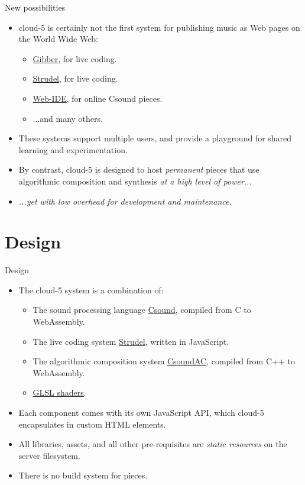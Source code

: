 \documentclass{beamer}
\begin{document}
\begin{frame}{New possibilities}
\begin{itemize}
\item cloud-5 is certainly not the first system for publishing music as Web pages on the World Wide Web:
\begin{itemize}
\item \href{https://gibber.cc/playground/}{Gibber}, for live coding.
\item \href{https://strudel.cc/}{Strudel}, for live coding.
\item \href{https://ide.csound.com/}{Web-IDE}, for online Csound pieces.
\item ...and many others.
\end{itemize}
\item These systems support multiple users, and provide a playground for shared learning and experimentation.
\item By contrast, cloud-5 is designed to host \emph{permanent} pieces that use algorithmic composition and synthesis \emph{at a high level of power...}
\item\emph{ ...yet with low overhead for development and maintenance.}
\end{itemize}
\end{frame}

\section{Design}
\begin{frame}{Design}
\begin{itemize}
\item The cloud-5 system is a combination of:
\begin{itemize}
\item The sound processing language \href{https://csound.com/}{Csound}, compiled from C to WebAssembly.
\item The live coding system \href{https://strudel.cc}{Strudel}, written in JavaScript.
\item The algorithmic composition system \href{https://github.com/gogins/csound-ac/blob/master/README.md}{CsoundAC}, compiled from C++ to WebAssembly.
\item \href{https://www.shadertoy.com/}{GLSL shaders}.
\end{itemize}
\item Each component comes with its own JavaScript API, which cloud-5 encapsulates in custom HTML elements.
\item All libraries, assets, and all other pre-requisites are \emph{static resources} on the server filesystem.
\item There is no build system for pieces.

\end{itemize}
\end{frame}
\end{document}
